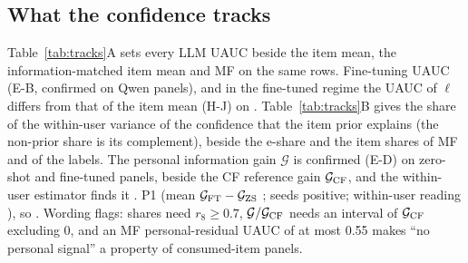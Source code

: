 \subsection{What the confidence tracks}\label{sec:exp-tracks}\label{sec:exp-rq4}
Table~\ref{tab:tracks}A sets every LLM UAUC beside the item mean, the information-matched item mean and MF on the same rows.
Fine-tuning  UAUC (E-B, confirmed on  Qwen panels), and
in the fine-tuned regime the UAUC of $\ell$ differs from that of the item mean (H-J) on .
Table~\ref{tab:tracks}B gives the share of the within-user variance of the confidence that the item prior explains (the non-prior
share is its complement), beside the e-share and the item shares of MF and of the labels. The personal information gain
$\mathcal G$ is confirmed (E-D) on  zero-shot and  fine-tuned panels, beside the CF reference gain $\mathcal G_{\rm CF}$, and the within-user estimator finds it
. P1  (mean $\mathcal G_{\rm FT}-\mathcal G_{\rm ZS}$
;  seeds positive; within-user reading ), so
.
Wording flags: shares need $r_8\ge0.7$, $\mathcal G/\mathcal G_{\rm CF}$ needs an interval of $\mathcal G_{\rm CF}$ excluding 0, and an
MF personal-residual UAUC of at most 0.55 makes ``no personal signal'' a property of consumed-item panels.

